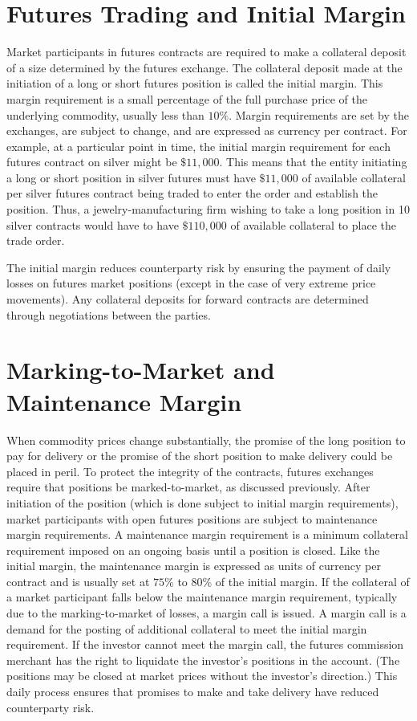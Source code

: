 \documentclass[11pt]{article}
\begin{document}
\section*{Futures Trading and Initial Margin}
Market participants in futures contracts are required to make a collateral deposit of a size determined by the futures exchange. The collateral deposit made at the initiation of a long or short futures position is called the initial margin. This margin requirement is a small percentage of the full purchase price of the underlying commodity, usually less than $10 \%$. Margin requirements are set by the exchanges, are subject to change, and are expressed as currency per contract. For example, at a particular point in time, the initial margin requirement for each futures contract on silver might be $\$ 11,000$. This means that the entity initiating a long or short position in silver futures must have $\$ 11,000$ of available collateral per silver futures contract being traded to enter the order and establish the position. Thus, a jewelry-manufacturing firm wishing to take a long position in 10 silver contracts would have to have $\$ 110,000$ of available collateral to place the trade order.

The initial margin reduces counterparty risk by ensuring the payment of daily losses on futures market positions (except in the case of very extreme price movements). Any collateral deposits for forward contracts are determined through negotiations between the parties.

\section*{Marking-to-Market and Maintenance Margin}
When commodity prices change substantially, the promise of the long position to pay for delivery or the promise of the short position to make delivery could be placed in peril. To protect the integrity of the contracts, futures exchanges require that positions be marked-to-market, as discussed previously. After initiation of the position (which is done subject to initial margin requirements), market participants with open futures positions are subject to maintenance margin requirements. A maintenance margin requirement is a minimum collateral requirement imposed on an ongoing basis until a position is closed. Like the initial margin, the maintenance margin is expressed as units of currency per contract and is usually set at $75 \%$ to $80 \%$ of the initial margin. If the collateral of a market participant falls below the maintenance margin requirement, typically due to the marking-to-market of losses, a margin call is issued. A margin call is a demand for the posting of additional collateral to meet the initial margin requirement. If the investor cannot meet the margin call, the futures commission merchant has the right to liquidate the investor's positions in the account. (The positions may be closed at market prices without the investor's direction.) This daily process ensures that promises to make and take delivery have reduced counterparty risk.
\end{document}
